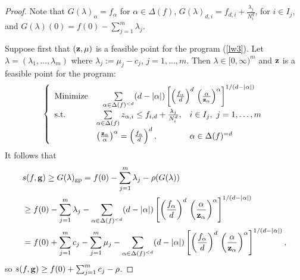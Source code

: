 \documentclass{amsart}
\theoremstyle{definition}
\begin{document}
\begin{proof} Note that $G(\lambda)_{\alpha} = f_{\alpha}$ for $\alpha \in \Delta(f)$,
$G(\lambda)_{d,i} = f_{d,i}+\frac{\lambda_j}{N_i^d}$, for $i \in I_j$, and $G(\lambda)(0) = f(0)-\sum_{j=1}^m \lambda_j$.

Suppose first that $({\bf z},\mu)$ is a feasible point for the program (\ref{lw3}). Let $\lambda = (\lambda_1,\dots,\lambda_m)$ where $\lambda_j := \mu_j-c_j$, $j=1,\dots,m$. Then $\lambda \in [0,\infty)^m$ and ${\bf z}$ is a feasible point for the program:
\begin{equation}\label{lw'}
\left\{
\begin{array}{lll}
	\textrm{Minimize} & \multicolumn{2}{c}{\sum\limits_{\alpha\in\Delta(f)^{<d}}(d-\vert\alpha\vert)
	 \left[\left(\frac{f_\alpha}{d}\right)^{d}\,\left(\frac{\alpha}{\mathbf{z}_\alpha}\right)^\alpha
	\right]^{1/(d-\vert\alpha\vert)}}\\
	\textrm{\mbox{s.t.}} & \sum\limits_{\alpha\in\Delta(f)}z_{\alpha,i} \le f_{i,d}+\frac{\lambda_j}{N_i^d}, & i  \in I_j, \ j=1,\ldots,m \\
	& \left(\frac{\mathbf{z}_\alpha}{\alpha}\right)^\alpha =\left(\frac{f_\alpha}{d}\right)^{d}, & \alpha\in\Delta(f)^{=d}
\end{array}\right.
\end{equation}
It follows that
\begin{align*}
& s(f,{\bf g}) \ge G(\lambda)_{\operatorname{gp}}  = f(0)- \sum_{j=1}^m \lambda_j - \rho(G(\lambda)) \\ & \ge f(0)- \sum_{j=1}^m \lambda_j - \sum\limits_{\alpha\in\Delta(f)^{<d}}(d-\vert\alpha\vert)\left[
	 \left(\frac{f_\alpha}{d}\right)^{d}\,\left(\frac{\alpha}{\mathbf{z}_\alpha}\right)^\alpha
	\right]^{1/(d-\vert\alpha\vert)} \\ & = f(0)+ \sum_{j=1}^m c_j -\sum_{j=1}^m \mu_j - \sum\limits_{\alpha\in\Delta(f)^{<d}}(d-\vert\alpha\vert)\left[
	 \left(\frac{f_\alpha}{d}\right)^{d}\,\left(\frac{\alpha}{\mathbf{z}_\alpha}\right)^\alpha
	\right]^{1/(d-\vert\alpha\vert)},
\end{align*}
so $s(f,{\bf g}) \ge f(0)+\sum_{j=1}^m c_j -\rho$.


\end{proof}
\end{document}
